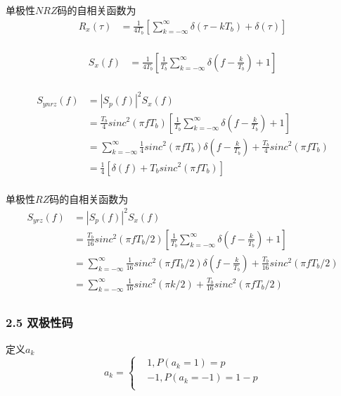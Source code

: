 \documentclass[
]{article}
\begin{document}
单极性$NRZ$码的自相关函数为\\
\begin{equation}
\begin{aligned}
R_x(\tau) &= \frac{1}{4 T_b} [\sum\limits_{k=-\infty}^{\infty} \delta(\tau-kT_b) + \delta(\tau)]\\
\end{aligned}
\end{equation}

\begin{equation}
\begin{aligned}
S_x(f) &= \frac{1}{4 T_b} [\frac{1}{T_b} \sum\limits_{k=-\infty}^{\infty} \delta(f-\frac{k}{T_b}) + 1]\\
\end{aligned}
\end{equation}

\begin{equation}
\begin{aligned}
S_{ynrz}(f) &= {\left| S_p(f) \right|}^2 S_x(f) \\
&= \frac{T_b}{4} sinc^2(\pi f T_b) [\frac{1}{T_b}\sum\limits_{k=-\infty}^{\infty} \delta(f-\frac{k}{T_b}) + 1]\\
&= \sum\limits_{k=-\infty}^{\infty} \frac{1}{4} sinc^2(\pi f T_b) \delta(f-\frac{k}{T_b}) + \frac{T_b}{4} sinc^2(\pi f T_b)\\
&= \frac{1}{4} [\delta(f) + T_b sinc^2(\pi f T_b)]\\
\end{aligned}
\end{equation}

单极性$RZ$码的自相关函数为\\
\begin{equation}
\begin{aligned}
S_{yrz}(f) &= {\left| S_p(f) \right|}^2 S_x(f) \\
&= \frac{T_b}{16} sinc^2(\pi f T_b/2) [\frac{1}{T_b}\sum\limits_{k=-\infty}^{\infty} \delta(f-\frac{k}{T_b}) + 1]\\
&= \sum\limits_{k=-\infty}^{\infty} \frac{1}{16} sinc^2(\pi f T_b/2) \delta(f-\frac{k}{T_b}) + \frac{T_b}{16} sinc^2(\pi f T_b/2)\\
&= \sum\limits_{k=-\infty}^{\infty} \frac{1}{16} sinc^2(\pi k/2) + \frac{T_b}{16} sinc^2(\pi f T_b/2)\\
\end{aligned}
\end{equation}

\hypertarget{header-n25}{%
\subsubsection{2.5 双极性码}\label{header-n25}}
定义${a_k}$
\begin{equation}
a_k =\left\{
\begin{aligned}
&1, P(a_k=1) = p\\
&-1, P(a_k=-1) = 1-p \\
\end{aligned}
\right.
\end{equation}
\end{document}
